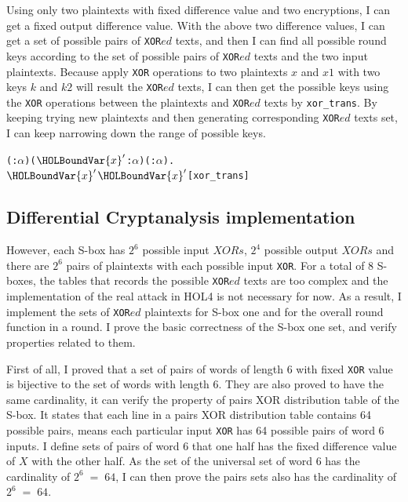 \documentclass{article}
\begin{document}
Using only two plaintexts with fixed difference value and two encryptions, I can get a fixed output difference value.
With the above two difference values, I can get a set of possible pairs of \verb|XOR|$ed$ texts, and then I can find all possible
round keys according to the set of possible pairs of \verb|XOR|$ed$ texts and the two input plaintexts. Because apply \verb|XOR|
operations to two plaintexts $x$ and $x1$ with two keys $k$ and $k2$ will result the \verb|XOR|$ed$ texts, I can then get
the possible keys using the \verb|XOR| operations between the plaintexts and \verb|XOR|$ed$ texts by \verb|xor_trans|. By keeping
trying new plaintexts and then generating corresponding \verb|XOR|$ed$ texts set, I can keep narrowing down the range
of possible keys.

\begin{alltt}
  \HOLTokenTurnstile{} \HOLSymConst{\HOLTokenForall{}}( :\ensuremath{\alpha} ) (\ensuremath{\HOLBoundVar{x}\sp{\prime{}}} :\ensuremath{\alpha} ) ( :\ensuremath{\alpha} ).
      \HOLSymConst{\HOLTokenEor{}}  \HOLSymConst{=} \ensuremath{\HOLBoundVar{x}\sp{\prime{}}} \HOLSymConst{\HOLTokenImp{}}  \HOLSymConst{\HOLTokenEor{}} \ensuremath{\HOLBoundVar{x}\sp{\prime{}}} \HOLSymConst{=} \hfill{[xor_trans]}
\end{alltt}

\subsection{Differential Cryptanalysis implementation}
However, each S-box has $2^6$ possible input $XORs$, $2^4$ possible output $XORs$ and there are $2^6$ pairs of plaintexts
with each possible input \verb|XOR|. For a total of 8 S-boxes, the tables that records the possible \verb|XOR|$ed$ texts are too
complex and the implementation of the real attack in HOL4 is not necessary for now. As a result, I implement the sets of \verb|XOR|$ed$
plaintexts for S-box one and for the overall round function in a round. I prove the basic correctness of the S-box one
set, and verify properties related to them.

First of all, I proved that a set of pairs of words of length 6 with fixed \verb|XOR| value is bijective to the set of
words with length 6. They are also proved to have the same cardinality, it can verify the property of pairs XOR distribution
table of
the S-box. It states that each line in a pairs XOR distribution table contains 64 possible pairs, means each particular
input \verb|XOR| has 64 possible pairs of word 6 inputs. I define
sets of pairs of word 6 that one half has the fixed difference value of $X$ with the other half. As the set of
the universal set of word 6 has the cardinality of $2^6\;=\;64$, I can then prove the pairs sets also has the cardinality
of $2^6\;=\;64$.
\end{document}
